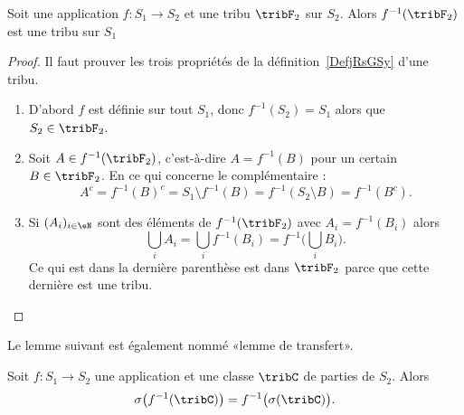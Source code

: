 \begin{lemma}       \label{LemooVDXJooZNYelH}
	Soit une application \( f\colon S_1\to S_2\) et une tribu \( \tribF_2\) sur \( S_2\). Alors \( f^{-1}(\tribF_2)\) est une tribu sur \( S_1\)
\end{lemma}

\begin{proof}
	Il faut prouver les trois propriétés de la définition~\ref{DefjRsGSy} d'une tribu.
	\begin{enumerate}
		\item
		      D'abord \( f\) est définie sur tout \( S_1\), donc \( f^{-1}(S_2)=S_1\) alors que \( S_2\in \tribF_2\).
		\item
		      Soit \( A\in f^{-1}(\tribF_2)\), c'est-à-dire \( A=f^{-1}(B)\) pour un certain \( B\in \tribF_2\). En ce qui concerne le complémentaire :
		      \begin{equation}
			      A^c=f^{-1}(B)^c=S_1\setminus f^{-1}(B)=f^{-1}(S_2\setminus B)=f^{-1}(B^c).
		      \end{equation}
		\item
		      Si \( (A_i)_{i\in \eN}\) sont des éléments de \( f^{-1}(\tribF_2)\) avec \( A_i=f^{-1}(B_i)\) alors
		      \begin{equation}
			      \bigcup_iA_i=\bigcup_if^{-1}(B_i)=f^{-1}\big( \bigcup_iB_i \big).
		      \end{equation}
		      Ce qui est dans la dernière parenthèse est dans \( \tribF_2\) parce que cette dernière est une tribu.
	\end{enumerate}
\end{proof}


Le lemme suivant est également nommé «lemme de transfert».
\begin{lemma}       \label{LemOQTBooWGYuDU}
	Soit \( f\colon S_1\to S_2\) une application et une classe \( \tribC\) de parties de \( S_2\). Alors
	\begin{equation}
		\sigma\big( f^{-1}(\tribC) \big)=f^{-1}\big( \sigma(\tribC) \big).
	\end{equation}
\end{lemma}

